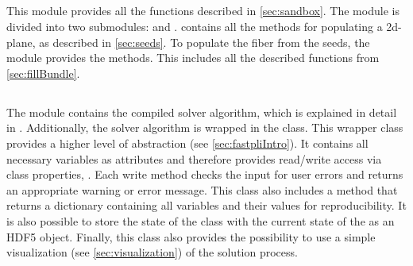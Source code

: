 \subsection{}
%
This module provides all the functions described in \cref{sec:sandbox}.
The module is divided into two submodules:  and .
 contains all the methods for populating a 2d-plane, as described in \cref{sec:seeds}.
To populate the fiber from the seeds, the  module provides the methods.
This includes all the described functions from \cref{sec:fillBundle}.
%
%
%
\subsection{}
%
The module  contains the compiled solver algorithm, which is explained in detail in .
Additionally, the solver algorithm is wrapped in the  class.
This wrapper class provides a higher level of abstraction (see \cref{sec:fastpliIntro}).
It contains all necessary variables as attributes and therefore provides read/write access via class properties, \eg{} .
Each write method checks the input for user errors and returns an appropriate warning or error message.
This class also includes a  method that returns a \python{} dictionary containing all variables and their values for reproducibility.
It is also possible to store the state of the class with the current state of the  as an \ac{HDF5} object.
Finally, this class also provides the possibility to use a simple visualization (see \cref{sec:visualization}) of the solution process.
%
%
%
